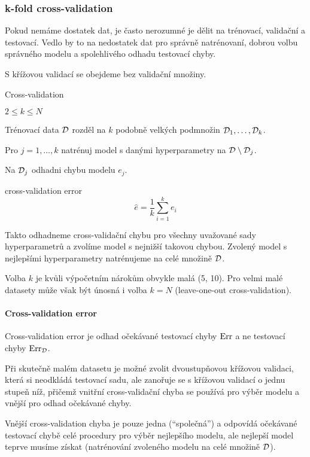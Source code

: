 \subsubsection{k-fold cross-validation}

Pokud nemáme dostatek dat, je často nerozumné je dělit na trénovací, validační a testovací. Vedlo by to na nedostatek dat pro správně natrénovaní, dobrou volbu správného modelu a spolehlivého odhadu testovací chyby.

S křížovou validací se obejdeme bez validační množiny.
\begin{algorithm}[H]
    \renewcommand{\thealgorithm}{}
    \caption{Cross-validation}
    \begin{algorithmic}[1]
        \Require $2 \le k \le N$
        \item Trénovací data $\mathcal{D}$ rozděl na $k$ podobně velkých podmnožin $\mathcal{D}_1, \ldots, \mathcal{D}_k$.
        \item Pro $j = 1, \ldots, k$ natrénuj model s danými hyperparametry na $\mathcal{D} \setminus \mathcal{D}_j$.
        \item Na $\mathcal{D}_j$ odhadni chybu modelu $e_j$.
        \item \Return cross-validation error
        \[\hat{e} = \frac{1}{k} \sum_{i=1}^{k} e_i\]
    \end{algorithmic}
\end{algorithm}

Takto odhadneme cross-validační chybu pro všechny uvažované sady hyperparametrů a zvolíme model s nejnižší takovou chybou. Zvolený model s nejlepšími hyperparametry natrénujeme na celé množině $\mathcal{D}$.

Volba $k$ je kvůli výpočetním nárokům obvykle malá (5, 10). Pro velmi malé datasety může však být únosná i volba $k=N$ (leave-one-out cross-validation).

\paragraph{Cross-validation error} Cross-validation error je odhad očekávané testovací chyby $\text{Err}$ a ne testovací chyby $\text{Err}_{\mathcal{D}}$.

Při skutečně malém datasetu je možné zvolit dvoustupňovou křížovou validaci, která si neodkládá testovací sadu, ale zanořuje se s křížovou validací o jednu stupeň níž, přičemž vnitřní cross-validační chyba se používá pro výběr modelu a vnější pro odhad očekávané chyby.

Vnější cross-validation chyba je pouze jedna (``společná'') a odpovídá očekávané testovací chybě celé procedury pro výběr nejlepšího
modelu, ale nejlepší model teprve musíme získat (natrénování zvoleného modelu na celé množině $\mathcal{D}$).

